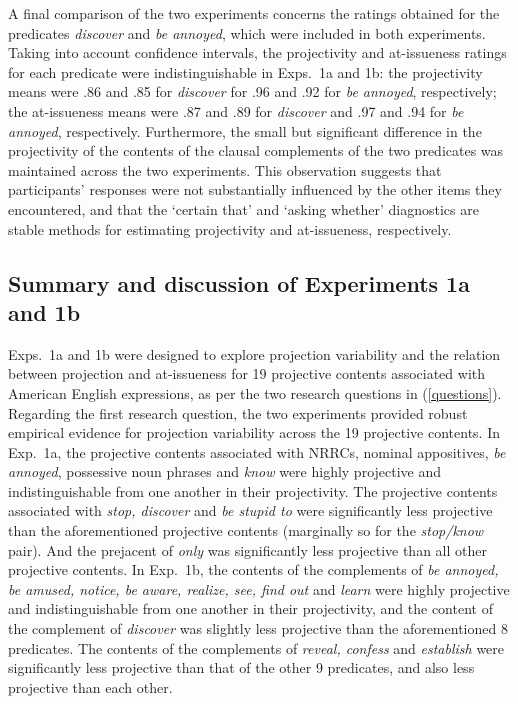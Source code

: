 \documentclass[11pt,fleqn]{article}
\newcommand{\6}{\mbox{$[\hspace*{-.6mm}[$}}
\newcommand{\9}{\mbox{$]\hspace*{-.6mm}]$}}
\begin{document}
A final comparison of the two experiments concerns the ratings obtained for the predicates {\em discover} and {\em be annoyed}, which were included in both experiments. Taking into account confidence intervals, the projectivity and at-issueness ratings for each predicate were indistinguishable in Exps.~1a and 1b: the projectivity means were .86 and .85 for {\em discover} for .96 and .92 for \emph{be annoyed}, respectively; the at-issueness means were .87 and .89 for \emph{discover} and .97 and .94 for \emph{be annoyed}, respectively. Furthermore, the small but significant difference in the projectivity of the contents of the clausal complements of the two predicates was maintained across the two experiments. This observation suggests that participants' responses were not substantially influenced by the other items they encountered, and that the `certain that' and `asking whether' diagnostics are stable methods for estimating projectivity and at-issueness, respectively.

\subsection{Summary and discussion of Experiments 1a and 1b}\label{s-summary1a1b}

Exps.~1a and 1b were designed to explore projection variability and the relation between projection and at-issueness for 19 projective contents associated with American English expressions, as per the two research questions in (\ref{questions}). Regarding the first research question, the two experiments provided robust empirical evidence for projection variability across the 19 projective contents. In Exp.~1a, the projective contents associated with NRRCs, nominal appositives, {\em be annoyed}, possessive noun phrases and {\em know} were highly projective and indistinguishable from one another in their projectivity. The projective contents associated with {\em stop, discover} and {\em be stupid to} were significantly less projective than the aforementioned projective contents (marginally so for the {\em stop/know} pair). And the prejacent of {\em only} was significantly less projective than all other projective contents. In Exp.~1b, the contents of the complements of {\em be annoyed, be amused, notice, be aware, realize, see, find out} and {\em learn} were highly projective and indistinguishable from one another in their projectivity, and the content of the complement of {\em discover} was slightly less projective than the aforementioned 8 predicates. The contents of the complements of {\em reveal, confess} and {\em establish} were significantly less projective than that of the other 9 predicates, and also less projective than each other.
\end{document}
